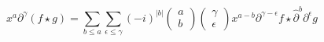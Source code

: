 \begin{equation}\label{eq205:ps}
	x^{a}\partial^{\gamma}(f\star g)=\sum_{b\leq a}\sum_{\epsilon\leq \gamma}(-i)^{\vert b\vert} \left( \begin{array}{c}
	a \\
	b
	\end{array} \right)\left(\begin{array}{c}
	\gamma \\
	\epsilon
	\end{array} \right) x^{a-b}\partial^{\gamma-\epsilon}f\star \hat{\partial}^{b}\partial^{\epsilon}g
\end{equation}

